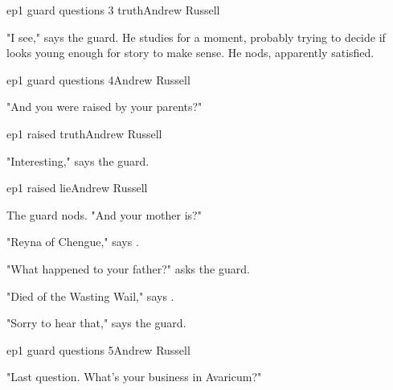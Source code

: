 \documentclass{book}
\begin{document}
\begin{childnode}{ep1 guard questions 3 truth}{Andrew Russell}

    "I see," says the guard. He studies \name{} for a moment, probably trying to decide if \heshe{} looks young enough for \hisher{} story to make sense. He nods, apparently satisfied.


\end{childnode}

\begin{childnode}{ep1 guard questions 4}{Andrew Russell}

    "And you were raised by your parents?"



\end{childnode}

\begin{childnode}{ep1 raised truth}{Andrew Russell}

    "Interesting," says the guard.


\end{childnode}

\begin{childnode}{ep1 raised lie}{Andrew Russell}

The guard nods. "And your mother is?"

"Reyna of Chengue," says \name{}.

"What happened to your father?" asks the guard.

"Died of the Wasting Wail," says \name{}.

"Sorry to hear that," says the guard.


\end{childnode}

\begin{childnode}{ep1 guard questions 5}{Andrew Russell}

"Last question. What's your business in Avaricum?"



\end{childnode}
\end{document}
